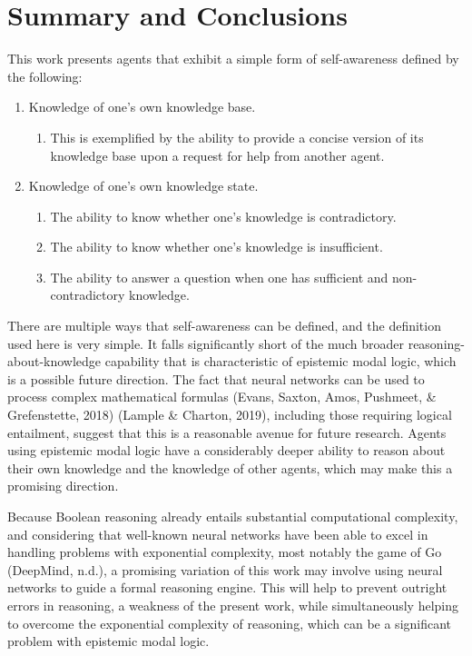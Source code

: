 \documentclass[
]{article}
\begin{document}
\hypertarget{summary-and-conclusions}{%
\section{Summary and Conclusions}\label{summary-and-conclusions}}

This work presents agents that exhibit a simple form of self-awareness
defined by the following:

\begin{enumerate}
\def\labelenumi{\arabic{enumi}.}
\item
  Knowledge of one's own knowledge base.

  \begin{enumerate}
  \def\labelenumii{\alph{enumii}.}
  \item
    This is exemplified by the ability to provide a concise version of
    its knowledge base upon a request for help from another agent.
  \end{enumerate}
\item
  Knowledge of one's own knowledge state.

  \begin{enumerate}
  \def\labelenumii{\alph{enumii}.}
  \item
    The ability to know whether one's knowledge is contradictory.
  \item
    The ability to know whether one's knowledge is insufficient.
  \item
    The ability to answer a question when one has sufficient and
    non-contradictory knowledge.
  \end{enumerate}
\end{enumerate}

There are multiple ways that self-awareness can be defined, and the
definition used here is very simple. It falls significantly short of the
much broader reasoning-about-knowledge capability that is characteristic
of epistemic modal logic, which is a possible future direction. The fact
that neural networks can be used to process complex mathematical
formulas (Evans, Saxton, Amos, Pushmeet, \& Grefenstette, 2018) (Lample
\& Charton, 2019), including those requiring logical entailment, suggest
that this is a reasonable avenue for future research. Agents using
epistemic modal logic have a considerably deeper ability to reason about
their own knowledge and the knowledge of other agents, which may make
this a promising direction.

Because Boolean reasoning already entails substantial computational
complexity, and considering that well-known neural networks have been
able to excel in handling problems with exponential complexity, most
notably the game of Go (DeepMind, n.d.), a promising variation of this
work may involve using neural networks to guide a formal reasoning
engine. This will help to prevent outright errors in reasoning, a
weakness of the present work, while simultaneously helping to overcome
the exponential complexity of reasoning, which can be a significant
problem with epistemic modal logic.
\end{document}
